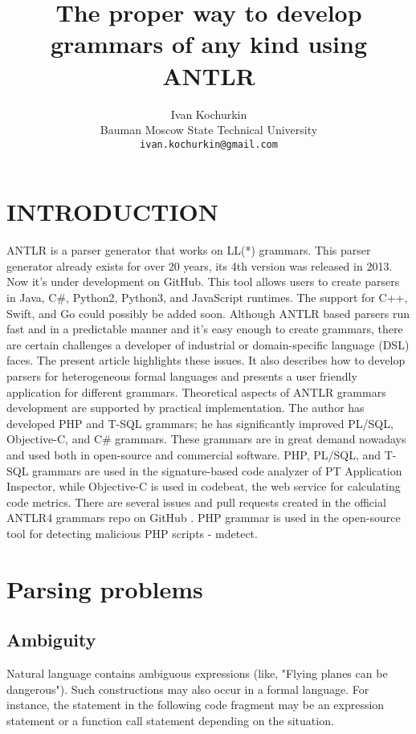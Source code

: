 \documentclass[a4paper, 10pt, conference]{ieeeconf}
\title{\LARGE \bf
The proper way to develop grammars of any kind using ANTLR
}
\author{Ivan Kochurkin \\
Bauman Moscow State Technical University\\
{\tt\small ivan.kochurkin@gmail.com}}
\begin{document}
\maketitle
\thispagestyle{empty}
\pagestyle{empty}

\section{INTRODUCTION}

ANTLR is a parser generator that works on LL(*) grammars.  This parser generator already exists for over 20 years, its 4th version was released in 2013. Now it’s under development on GitHub. This tool allows users to create parsers in Java, C\#, Python2, Python3, and JavaScript runtimes. The support for C++, Swift, and Go could possibly be added soon.
Although ANTLR based parsers run fast and in a predictable manner and it’s easy enough to create grammars, there are certain challenges a developer of industrial or domain-specific language (DSL) faces. The present article highlights these issues. It also describes how to develop parsers for heterogeneous formal languages and presents a user friendly application for different grammars. Theoretical aspects of ANTLR grammars development are supported by practical implementation. The author has developed PHP and T-SQL grammars; he has significantly improved PL/SQL, Objective-C, and C\# grammars. These grammars are in great demand nowadays and used both in open-source and commercial software. PHP, PL/SQL, and T-SQL grammars are used in the signature-based code analyzer of PT Application Inspector, while Objective-C is used in codebeat, the web service for calculating code metrics\cite{codebeat-objectivec}. There are several issues and pull requests created in the official ANTLR4 grammars repo on GitHub \cite{antlr-grammars}. PHP grammar is used in the open-source tool for detecting malicious PHP scripts - mdetect\cite{mdetect}.

\section{Parsing problems}

\subsection{Ambiguity}

Natural language contains ambiguous expressions (like, "Flying planes can be dangerous"). Such constructions may also occur in a formal language. For instance, the statement in the following code fragment may be an expression statement or a function call statement depending on the situation.
\end{document}
